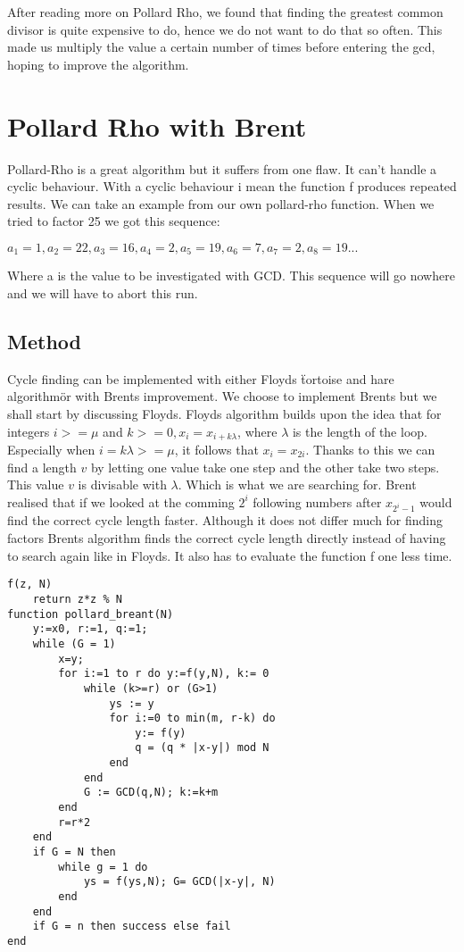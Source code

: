 \documentclass[a4paper, 12pt]{report}
\begin{document}
After reading more on Pollard Rho, we found that finding the greatest common divisor is quite expensive to do, hence we do not want to do that so often. This made us multiply the value a certain number of times before entering the gcd, hoping to improve the algorithm.

\section{Pollard Rho with Brent}
Pollard-Rho is a great algorithm but it suffers from one flaw. It can't handle a cyclic behaviour. With a cyclic behaviour i mean the function f produces repeated results. We can take an example from our own pollard-rho function. When we tried to factor 25 we got this sequence:
\begin{center}
$a_1=1, a_2=22, a_3=16, a_4=2, a_5=19, a_6=7, a_7=2, a_8=19...$
\end{center}
Where a is the value to be investigated with GCD. This sequence will go nowhere and we will have to abort this run.

\subsection{Method}
Cycle finding can be implemented with either Floyds \"tortoise and hare algorithm\" or with Brents improvement. We choose to implement Brents but we shall start by discussing Floyds. Floyds algorithm builds upon the idea that for integers $i >= \mu$ and $k >= 0, x_i = x_{i + k\lambda}$, where $\lambda$ is the length of the loop. Especially when $i = k\lambda >= \mu$, it follows that $x_i = x_{2i}$. Thanks to this we can find a length $v$ by letting one value take one step and the other take two steps. This value $v$ is divisable with $\lambda$. Which is what we are searching for. Brent realised that if we looked at the comming $2^i$ following numbers after $x_{2^i-1}$ would find the correct cycle length faster. Although it does not differ much for finding factors Brents algorithm finds the correct cycle length directly instead of having to search again like in Floyds. It also has to evaluate the function f one less time.

\begin{lstlisting}
f(z, N)
	return z*z % N
function pollard_breant(N)
	y:=x0, r:=1, q:=1;
	while (G = 1)
		x=y;
		for i:=1 to r do y:=f(y,N), k:= 0
			while (k>=r) or (G>1)
				ys := y
				for i:=0 to min(m, r-k) do
					y:= f(y)
					q = (q * |x-y|) mod N
				end
			end
			G := GCD(q,N); k:=k+m
		end
		r=r*2
	end
	if G = N then
		while g = 1 do
			ys = f(ys,N); G= GCD(|x-y|, N)
		end
	end
	if G = n then success else fail
end
\end{lstlisting}
\end{document}
